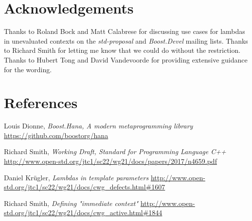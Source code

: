 \documentclass{wg21}
\begin{document}
\section{Acknowledgements}
Thanks to Roland Bock and Matt Calabrese for discussing use cases for lambdas
in unevaluated contexts on the \textit{std-proposal} and \textit{Boost.Devel}
mailing lists. Thanks to Richard Smith for letting me know that we could do
without the restriction. Thanks to Hubert Tong and David Vandevoorde for
providing extensive guidance for the wording.


\section{References}
\renewcommand{\section}[2]{}%
\begin{thebibliography}{9}

    Louis Dionne,
    \emph{Boost.Hana, A modern metaprogramming library}\newline
    \url{https://github.com/boostorg/hana}

    Richard Smith,
    \emph{Working Draft, Standard for Programming Language C++}\newline
    \url{http://www.open-std.org/jtc1/sc22/wg21/docs/papers/2017/n4659.pdf}

    Daniel Kr{\"u}gler,
    \emph{Lambdas in template parameters}\newline
    \url{http://www.open-std.org/jtc1/sc22/wg21/docs/cwg_defects.html#1607}

    Richard Smith,
    \emph{Defining "immediate context"}\newline
    \url{http://www.open-std.org/jtc1/sc22/wg21/docs/cwg_active.html#1844}

\end{thebibliography}
\end{document}
